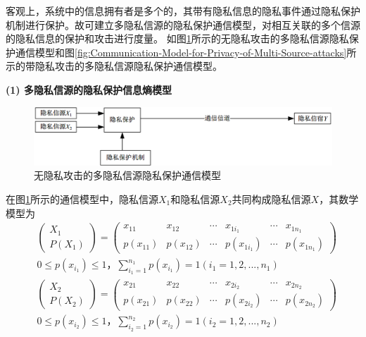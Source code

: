 客观上，系统中的信息拥有者是多个的，其带有隐私信息的隐私事件通过隐私保护机制进行保护。故可建立多隐私信源的隐私保护通信模型，对相互关联的多个信源的隐私信息的保护和攻击进行度量。 如图\ref{fig:Communication-Model-for-Privacy-of-Multi-Source}所示的无隐私攻击的多隐私信源隐私保护通信模型和图\ref{fig:Communication-Model-for-Privacy-of-Multi-Source-attacks}所示的带隐私攻击的多隐私信源隐私保护通信模型。

\textbf{(1) 多隐私信源的隐私保护信息熵模型}

\begin{figure}[htbp]
	\centering
	\includegraphics[width = 0.95\linewidth]{./figures/Communication-Model-for-Privacy-of-Multi-Source.png}
	\caption{无隐私攻击的多隐私信源隐私保护通信模型}
	\label{fig:Communication-Model-for-Privacy-of-Multi-Source}
\end{figure}

在图\ref{fig:Communication-Model-for-Privacy-of-Multi-Source}所示的通信模型中，隐私信源$X_{1}$和隐私信源$X_{2}$共同构成隐私信源$X$，其数学模型为
\begin{equation}
\begin{split}
&\begin{pmatrix}
X_{1}\\ 
P(X_{1})
\end{pmatrix}=\begin{pmatrix}
x_{11} & x_{12} & \cdots  & x_{1i_{1}} & \cdots  & x_{1n_{1}}\\ 
p(x_{11})& p(x_{12}) & \cdots & p(x_{1i_{1}}) & \cdots & p(x_{1n_{1}})
\end{pmatrix} \\
&0\leqslant p(x_{i_{1}})\leqslant 1，\sum_{i_{1}=1}^{n_{1}}p(x_{i_{1}})=1(i_{1}=1,2,...,n_{1})
\end{split}
\end{equation}
\begin{equation}
\begin{split}
&\begin{pmatrix}
X_{2}\\ 
P(X_{2})
\end{pmatrix}=\begin{pmatrix}
x_{21} & x_{22} & \cdots  & x_{2i_{2}} & \cdots  & x_{2n_{2}}\\ 
p(x_{21})& p(x_{22}) & \cdots & p(x_{2i_{2}}) & \cdots & p(x_{2n_{2}})
\end{pmatrix} \\
&0\leqslant p(x_{i_{2}})\leqslant 1，\sum_{i_{2}=1}^{n_{2}}p(x_{i_{2}})=1(i_{2}=1,2,...,n_{2})
\end{split}
\end{equation}

